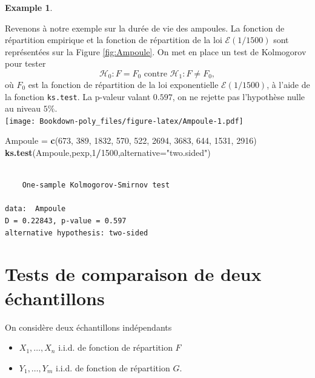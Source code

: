 \documentclass[
]{book}
\newenvironment{Shaded}{\begin{snugshade}}{\end{snugshade}}
\newcommand{\DataTypeTok}[1]{\textcolor[rgb]{0.13,0.29,0.53}{#1}}
\newcommand{\DecValTok}[1]{\textcolor[rgb]{0.00,0.00,0.81}{#1}}
\newcommand{\KeywordTok}[1]{\textcolor[rgb]{0.13,0.29,0.53}{\textbf{#1}}}
\newcommand{\NormalTok}[1]{#1}
\newcommand{\OperatorTok}[1]{\textcolor[rgb]{0.81,0.36,0.00}{\textbf{#1}}}
\newcommand{\StringTok}[1]{\textcolor[rgb]{0.31,0.60,0.02}{#1}}
\providecommand{\tightlist}{%
  \setlength{\itemsep}{0pt}\setlength{\parskip}{0pt}}
\theoremstyle{definition}
\theoremstyle{definition}
\newtheorem{example}{Example}[chapter]
\theoremstyle{definition}
\theoremstyle{definition}
\theoremstyle{remark}
\begin{document}
\begin{example}
\protect\hypertarget{exm:unlabeled-div-23}{}\label{exm:unlabeled-div-23}

Revenons à notre exemple sur la durée de vie des ampoules. La fonction de répartition empirique et la fonction de répartition de la loi \(\mathcal E(1/1500)\) sont représentées sur la Figure \ref{fig:Ampoule}.
On met en place un test de Kolmogorov pour tester
\[
\mathcal{H}_0 : F = F_0 \textrm{ contre } \mathcal{H}_1 : F \neq F_0,
\]
où \(F_0\) est la fonction de répartition de la loi exponentielle \(\mathcal E(1/1500)\), à l'aide de la fonction \texttt{ks.test}. La p-valeur valant \(0.597\), on ne rejette pas l'hypothèse nulle au niveau \(5\%\).\\
\texttt{[image: Bookdown-poly\_files/figure-latex/Ampoule-1.pdf]}

\begin{Shaded}
\begin{Highlighting}[]
\NormalTok{Ampoule =}\StringTok{ }\KeywordTok{c}\NormalTok{(}\DecValTok{673}\NormalTok{, }\DecValTok{389}\NormalTok{, }\DecValTok{1832}\NormalTok{, }\DecValTok{570}\NormalTok{, }\DecValTok{522}\NormalTok{, }\DecValTok{2694}\NormalTok{, }\DecValTok{3683}\NormalTok{, }\DecValTok{644}\NormalTok{, }\DecValTok{1531}\NormalTok{, }\DecValTok{2916}\NormalTok{) }
\KeywordTok{ks.test}\NormalTok{(Ampoule,pexp,}\DecValTok{1}\OperatorTok{/}\DecValTok{1500}\NormalTok{,}\DataTypeTok{alternative=}\StringTok{"two.sided"}\NormalTok{)}
\end{Highlighting}
\end{Shaded}

\begin{verbatim}

    One-sample Kolmogorov-Smirnov test

data:  Ampoule
D = 0.22843, p-value = 0.597
alternative hypothesis: two-sided
\end{verbatim}

\end{example}

\hypertarget{tests-de-comparaison-de-deux-uxe9chantillons}{%
\section{Tests de comparaison de deux échantillons}\label{tests-de-comparaison-de-deux-uxe9chantillons}}

On considère deux échantillons indépendants

\begin{itemize}
\tightlist
\item
  \(X_1,\ldots, X_n\) i.i.d. de fonction de répartition \(F\)
\item
  \(Y_1, \ldots, Y_m\) i.i.d. de fonction de répartition \(G\).
\end{itemize}
\end{document}
